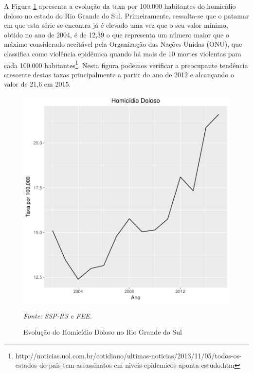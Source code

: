 \documentclass[12pt,openright,oneside,a4paper,english,french,spanish]{abntex2}
\numberwithin{table}{section} %
\numberwithin{figure}{section} %
\newcommand{\source}[1]{\textit{#1}}
\begin{document}
A Figura \ref{fig:homDolRS} apresenta a evolução da taxa por 100.000 habitantes do homicídio doloso no estado do Rio Grande do Sul. Primeiramente, ressalta-se que o patamar em que esta série se encontra já é elevado uma vez que o seu valor mínimo, obtido no ano de 2004, é de 12,39 o que representa um número maior que o máximo considerado aceitável pela Organização das Nações Unidas (ONU), que classifica como violência epidêmica quando há mais de 10 mortes violentas para cada 100.000 habitantes\footnote{http://noticias.uol.com.br/cotidiano/ultimas-noticias/2013/11/05/todos-os-estados-do-pais-tem-assassinatos-em-niveis-epidemicos-aponta-estudo.htm}. Nesta figura podemos verificar a preocupante tendência crescente destas taxas principalmente a partir do ano de 2012 e alcançando o valor de 21,6 em 2015.

\begin{figure}
\begin{center}
\includegraphics{TESE_DE_DOUTORADO_RENAN_FINAL-plot3}
\end{center}
\caption{Evolução do Homicídio Doloso no Rio Grande do Sul}
\source{Fonte: SSP-RS e FEE.}
\label{fig:homDolRS}
\end{figure}
\end{document}
